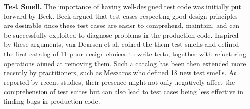 \documentclass[conference]{IEEEtran}
\begin{document}






\textbf{Test Smell.} The importance of having well-designed test code was initially put forward by Beck\cite{b4}. Beck argued that test cases respecting good design principles are desirable since these test cases are easier to comprehend, maintain, and can be successfully exploited to diagnose problems in the production code. Inspired by these arguments, van Deursen et al.\cite{b7} coined the them test smells and defined the first catalog of 11 poor design choices to write tests, together with refactoring operations aimed at removing them. Such a catalog has been then extended more recently by practitioners, such as Meszaros\cite{b6} who defined 18 new test smells. As reported by recent studies, their presence might not only negatively affect the comprehension of test suites but can also lead to test cases being less effective in finding bugs in production code\cite{b8}.
\end{document}
